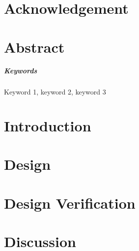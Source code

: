 \documentclass{senior-design}
\begin{document}
\individualreportcover %
\generalreportcover %
\addemptypage
\frontmatter

\chapter*{Acknowledgement}\thispagestyle{acknowledgement}



\chapter*{Abstract}\thispagestyle{abstract}

\paragraph{Keywords}
Keyword 1, keyword 2, keyword 3

\tableofcontents\thispagestyle{toc}

\mainmatter
\chapter{Introduction}

\chapter{Design}

\chapter{Design Verification}

\chapter{Discussion}
\end{document}
